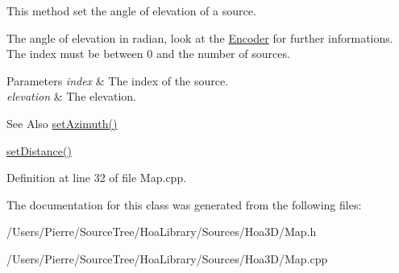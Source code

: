 This method set the angle of elevation of a source. 

The angle of elevation in radian, look at the \hyperlink{class_hoa3_d_1_1_encoder}{Encoder} for further informations. The index must be between 0 and the number of sources.


\begin{DoxyParams}{Parameters}
{\em index} & The index of the source. \\
\hline
{\em elevation} & The elevation. \\
\hline
\end{DoxyParams}
\begin{DoxySeeAlso}{See Also}
\hyperlink{class_hoa3_d_1_1_map_a751e3f421578c43bf42eca7888a34839}{set\-Azimuth()} 

\hyperlink{class_hoa3_d_1_1_map_a23a9cb2b7256d46e6cdc8c40d4bab177}{set\-Distance()} 
\end{DoxySeeAlso}


Definition at line 32 of file Map.\-cpp.



The documentation for this class was generated from the following files\-:\begin{DoxyCompactItemize}
\item 
/\-Users/\-Pierre/\-Source\-Tree/\-Hoa\-Library/\-Sources/\-Hoa3\-D/Map.\-h\item 
/\-Users/\-Pierre/\-Source\-Tree/\-Hoa\-Library/\-Sources/\-Hoa3\-D/Map.\-cpp\end{DoxyCompactItemize}
